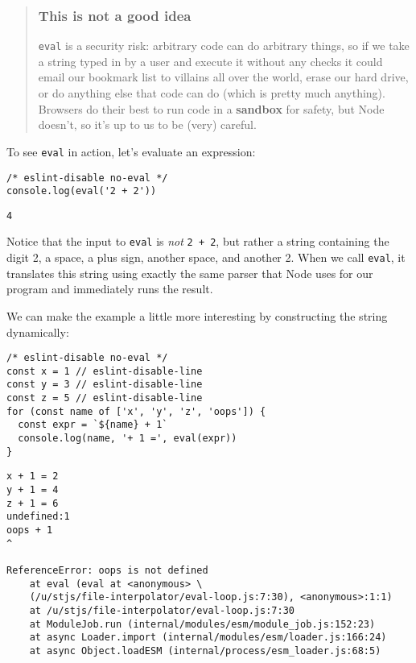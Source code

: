 \documentclass[krantzl]{krantz}
\newcommand{\glossref}[1]{\textbf{#1}}
\newenvironment{callout}{\savenotes\begin{tBox}\begin{quotation}\toggletrue{inbox}\renewcommand{\thempfootnote}{\arabic{footnote}}}{\end{quotation}\vspace{\baselineskip}\end{tBox}\togglefalse{inbox}\spewnotes}
\begin{document}
\begin{callout}


\subsubsection*{This is not a good idea}


\texttt{eval} is a security risk:
arbitrary code can do arbitrary things,
so if we take a string typed in by a user and execute it without any checks
it could email our bookmark list to villains all over the world,
erase our hard drive,
or do anything else that code can do (which is pretty much anything).
Browsers do their best to run code in a \glossref{sandbox} for safety,
but Node doesn't,
so it's up to us to be (very) careful.

\end{callout}


To see \texttt{eval} in action,
let's evaluate an expression:


\begin{lstlisting}[frame=single,frameround=tttt]
/* eslint-disable no-eval */
console.log(eval('2 + 2'))
\end{lstlisting}



\begin{lstlisting}[frame=single,frameround=tttt]
4
\end{lstlisting}



\noindent Notice that the input to \texttt{eval} is \emph{not} \texttt{2 + 2},
but rather a string containing the digit 2,
a space,
a plus sign,
another space,
and another 2.
When we call \texttt{eval},
it translates this string
using exactly the same parser that Node uses for our program
and immediately runs the result.


We can make the example a little more interesting
by constructing the string dynamically:


\begin{lstlisting}[frame=single,frameround=tttt]
/* eslint-disable no-eval */
const x = 1 // eslint-disable-line
const y = 3 // eslint-disable-line
const z = 5 // eslint-disable-line
for (const name of ['x', 'y', 'z', 'oops']) {
  const expr = `${name} + 1`
  console.log(name, '+ 1 =', eval(expr))
}
\end{lstlisting}



\begin{lstlisting}[frame=single,frameround=tttt]
x + 1 = 2
y + 1 = 4
z + 1 = 6
undefined:1
oops + 1
^

ReferenceError: oops is not defined
    at eval (eval at <anonymous> \
    (/u/stjs/file-interpolator/eval-loop.js:7:30), <anonymous>:1:1)
    at /u/stjs/file-interpolator/eval-loop.js:7:30
    at ModuleJob.run (internal/modules/esm/module_job.js:152:23)
    at async Loader.import (internal/modules/esm/loader.js:166:24)
    at async Object.loadESM (internal/process/esm_loader.js:68:5)
\end{lstlisting}
\end{document}
